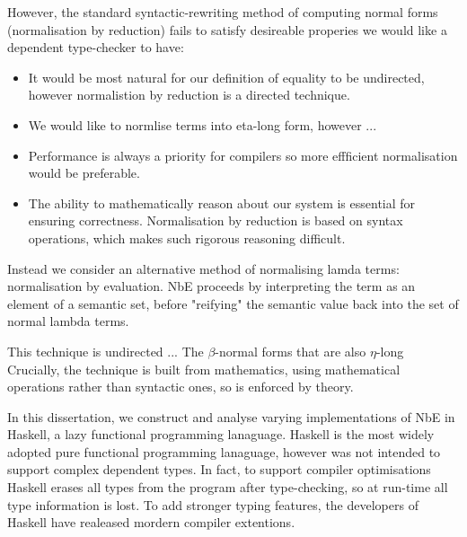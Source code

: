 However, the standard syntactic-rewriting method of computing normal forms (normalisation by reduction) fails to satisfy desireable properies we would like a dependent type-checker to have:
\begin{itemize}
    \item 
    It would be most natural for our definition of equality to be undirected, however normalistion by reduction is a directed technique.

    \item We would like to normlise terms into eta-long form, however ... 
    
    \item Performance is always a priority for compilers so more effficient normalisation would be preferable.
    
    \item The ability to mathematically reason about our system is essential for ensuring correctness. Normalisation by reduction is based on syntax operations, which makes such rigorous reasoning difficult.
\end{itemize}

Instead we consider an alternative method of normalising lamda terms: normalisation by evaluation. NbE proceeds by interpreting the term as an element of a semantic set, before "reifying" the semantic value back into the set of normal lambda terms. 

This technique is undirected ...
The  $\beta$-normal forms that are also $\eta$-long
Crucially, the technique is built from mathematics, using mathematical operations rather than syntactic ones, so is enforced by theory.


In this dissertation, we construct and analyse varying implementations of NbE in Haskell, a lazy functional programming lanaguage. Haskell is the most widely adopted pure functional programming lanaguage, however was not intended to support complex dependent types. In fact, to support compiler optimisations Haskell erases all types from the program after type-checking, so at run-time all type information is lost. To add stronger typing features, the developers of Haskell have realeased mordern compiler extentions. 

